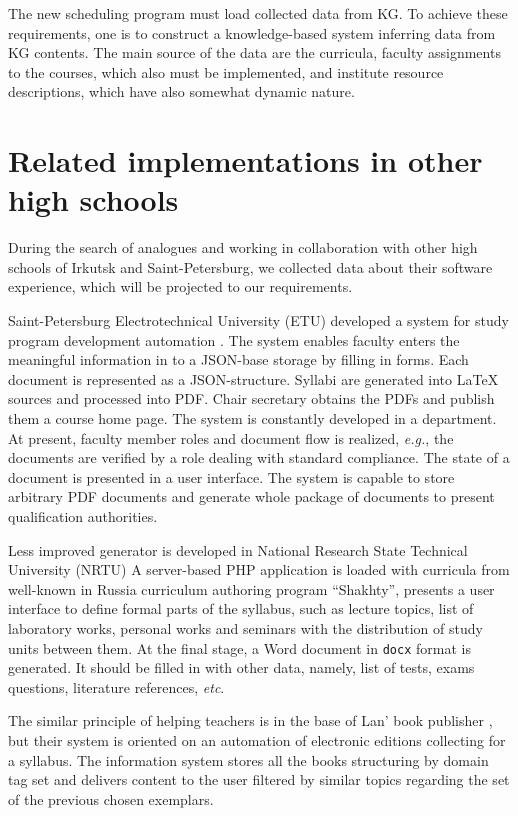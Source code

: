 \documentclass[
]{aiitart}
\begin{document}
The new scheduling program must load collected data from KG.  To achieve these requirements, one is to construct a knowledge-based system inferring data from KG contents.  The main source of the data are the curricula, faculty assignments to the courses, which also must be implemented, and institute resource descriptions, which have also somewhat dynamic nature.

\section{Related implementations in other high schools}

During the search of analogues and working in collaboration with other high schools of Irkutsk and Saint-Petersburg, we collected data about their software experience, which will be projected to our requirements.

Saint-Petersburg Electrotechnical University (ETU) developed a system for study program development automation \cite{leti}. %
The system enables faculty enters the meaningful information in to a JSON-base storage by filling in forms.  Each document is represented as a JSON-structure.  Syllabi are generated into \LaTeX{} sources and processed into PDF.  Chair secretary obtains the PDFs and publish them a course home page.  The system is constantly developed in a department.  At present, faculty member roles and document flow is realized, \emph{e.g.}, the documents are verified by a role dealing with standard compliance.  The state of a document is presented in a user interface.  The system is capable to store arbitrary PDF documents and generate whole package of documents to present qualification authorities.

Less improved generator is developed in National Research State Technical University (NRTU) \cite{nrtu} %
A server-based PHP application is loaded with curricula from well-known in Russia curriculum authoring program ``Shakhty'', presents a user interface to define formal parts of the syllabus, such as lecture topics, list of laboratory works, personal works and seminars with the distribution of study units between them.  At the final stage, a Word document in \verb|docx| format is generated.  It should be filled in with other data, namely, list of tests, exams questions, literature references, \emph{etc}.

The similar principle of helping teachers is in the base of Lan' book publisher \cite{lanbook}, but their system is oriented on an automation of electronic editions collecting for a syllabus.  The information system stores all the books structuring by domain tag set and delivers content to the user filtered by similar topics regarding the set of the previous chosen exemplars.
\end{document}

